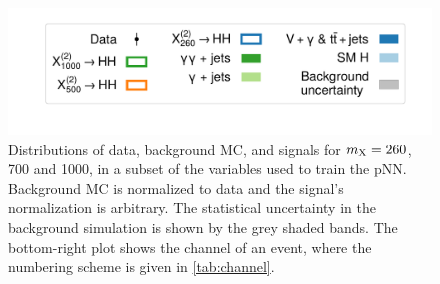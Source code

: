 \begin{figure}
    \includegraphics[width=.7\linewidth]{Figures/Dihiggs/categorisation/input_features/Graviton/Scale_equal/legend.pdf}
    \caption[Distributions of Training Features (6)]{Distributions of data, background MC, and \XTwoHH signals for $m_{\mathrm{X}}=260$, 700 and 1000\GeV, in a subset of the variables used to train the pNN. Background MC is normalized to data and the signal's normalization is arbitrary. The statistical uncertainty in the background simulation is shown by the grey shaded bands. The bottom-right plot shows the channel of an event, where the numbering scheme is given in \cref{tab:channel}.}\label{fig:training_features_6}
\end{figure}


